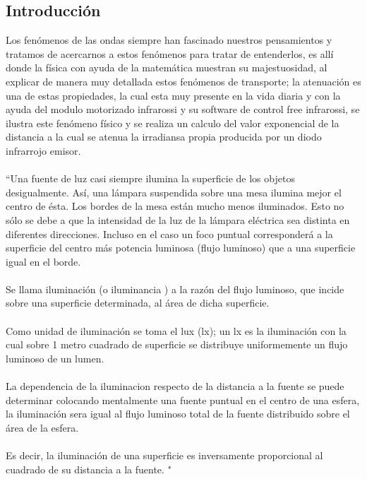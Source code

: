 \documentclass[12]{article}
\begin{document}

\begin{multicols}{2}
\section{Introducción}
Los fenómenos de las ondas siempre han fascinado nuestros pensamientos y tratamos de acercarnos a estos fenómenos para tratar de entenderlos, es allí donde la física con ayuda de la matemática muestran su majestuosidad, al explicar de manera muy detallada estos fenómenos de transporte; la atenuación es una de estas propiedades, la cual esta muy presente en la vida diaria y con la ayuda del modulo motorizado infrarossi y su software de control free infrarossi, se ilustra este fenómeno físico y se realiza un calculo del valor exponencial de la distancia a la cual se atenua la irradiansa propia producida por un diodo infrarrojo emisor. \\ \\
``Una fuente de luz casi siempre ilumina la superficie de los objetos desigualmente. Así, una lámpara suspendida sobre una mesa ilumina mejor el centro de ésta. Los bordes de la mesa están mucho menos iluminados. Esto no sólo se debe a que la intensidad de la luz de la lámpara eléctrica sea distinta en diferentes direcciones. Incluso en el caso un foco puntual corresponderá a la superficie del centro más potencia luminosa (flujo luminoso)  que a una superficie igual en el borde. \\ \\
Se llama iluminación (o iluminancia ) a la razón del flujo luminoso, que incide sobre una superficie determinada, al área de dicha superficie. \\ \\
Como unidad de iluminación se toma el lux (lx); un lx es la iluminación con la cual sobre 1 metro cuadrado de superficie se distribuye uniformemente un flujo luminoso de un lumen. \\ \\
La dependencia de la iluminacion respecto de la distancia a la fuente se puede determinar colocando mentalmente una fuente puntual en el centro de una esfera, la iluminación sera igual al flujo luminoso total de la fuente distribuido sobre el área de la esfera. \\ \\
Es decir, la iluminación de una superficie es inversamente proporcional al cuadrado de su distancia a la fuente. "\cite{FISICA4}

\end{multicols}
\end{document}
